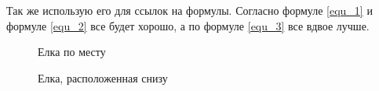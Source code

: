 \documentclass{article}
\begin{document}
Так же использую его для ссылок на формулы. Согласно формуле \ref{equ_1} и формуле \ref{equ_2} все будет хорошо, а по формуле \ref{equ_3} все вдвое лучше.

\begin{figure}[h!]
	\caption{Елка по месту}
	\label{fig:elka_here}
\end{figure}

\begin{figure}[b!]
	\caption{Елка, расположенная снизу}
	\label{fig:elka_bottom}
\end{figure}
\end{document}
